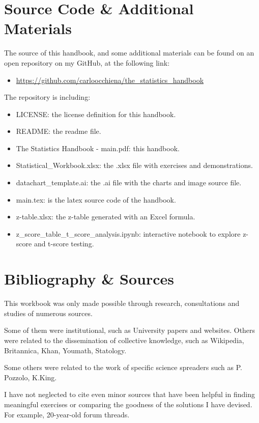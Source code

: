 \documentclass{article}
\begin{document}
\section{Source Code \& Additional Materials}
The source of this handbook, and some additional materials can be found on an open repository on my GitHub, at the following link:
\begin{itemize}
    \item \url{https://github.com/carloocchiena/the_statistics_handbook}
\end{itemize}

The repository is including:
\begin{itemize}
    \item LICENSE: the license definition for this handbook.
    \item README: the readme file.
    \item The Statistics Handbook - main.pdf: this handbook.
    \item Statistical\_Workbook.xlsx: the .xlsx file with exercises and demonstrations.
    \item datachart\_template.ai: the .ai file with the charts and image source file.
    \item main.tex: is the latex source code of the handbook.
    \item z-table.xlsx: the z-table generated with an Excel formula.
    \item z\_score\_table\_t\_score\_analysis.ipynb: interactive notebook to explore z-score and t-score testing.
\end{itemize}

\section{Bibliography \& Sources}
This workbook was only made possible through research, consultations and studies of numerous sources. 

Some of them were institutional, such as University papers and websites. 
Others were related to the dissemination of collective knowledge, such as Wikipedia, Britannica, Khan, Youmath, Statology.

Some others were related to the work of specific science spreaders such as P. Pozzolo, K.King.

I have not neglected to cite even minor sources that have been helpful in finding meaningful exercises or comparing the goodness of the solutions I have devised. For example, 20-year-old forum threads.
\end{document}
